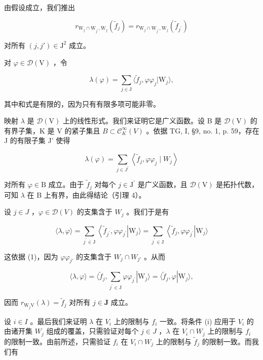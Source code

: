 由假设成立，我们推出

\[
r _ {\mathrm{W} _ {j} \cap \mathrm{W} _ {j ^ {\prime}}, \mathrm{W} _ {j}} (\widetilde {f} _ {j}) = r _ {\mathrm{W} _ {j} \cap \mathrm{W} _ {j ^ {\prime}}, \mathrm{W} _ {j}} (\widetilde {f} _ {j ^ {\prime}})\tag{1}
\]

对所有 \((j, j') \in \mathrm{J}^{2}\) 成立。

对 \(\varphi \in \mathcal{D}(\mathrm{V})\) ，令

\[
\lambda (\varphi) = \sum_ {j \in \mathrm{J}} \langle \widetilde {f} _ {j}, \varphi \varphi_ {j} | \mathrm{W} _ {j} \rangle ,
\]

其中和式是有限的，因为只有有限多项可能非零。

映射 \(\lambda\) 是 \(\mathcal{D}(\mathrm{V})\) 上的线性形式。我们来证明它是广义函数。设 B 是 \(\mathcal{D}(\mathrm{V})\) 的有界子集，K 是 V 的紧子集且 \(B \subset \mathcal{C}_{K}^{\infty}(V)\) 。依据 TG, I, §9, no. 1, p. 59，存在 J 的有限子集 J' 使得

\[
\lambda (\varphi) = \sum_ {j \in J ^ {\prime}} \left\langle \widetilde {f} _ {j}, \varphi \varphi_ {j} \mid W _ {j} \right\rangle
\]

对所有 \(\varphi\in\mathrm{B}\) 成立。由于 \(\widetilde{f}_{j}\) 对每个 \(j\in\mathrm{J}^{\prime}\) 是广义函数，且 \(\mathcal{D}(\mathrm{V})\) 是拓扑代数，可知 \(\lambda\) 在 B 上有界，由此得结论（引理 4）。

设 \(j \in J\) ，\(\varphi \in \mathcal{D}(V)\) 的支集含于 \(W_{j}\) 。我们于是有

\[
\langle \lambda , \varphi \rangle = \sum_ {j ^ {\prime} \in \mathrm{J}} \left\langle \widetilde {f} _ {j ^ {\prime}}, \varphi \varphi_ {j ^ {\prime}} \right| \mathrm{W} _ {j} \rangle = \sum_ {j ^ {\prime} \in \mathrm{J}} \left\langle \widetilde {f} _ {j}, \varphi \varphi_ {j ^ {\prime}} \right| \mathrm{W} _ {j} \rangle
\]

这依据 (1)，因为 \(\varphi\varphi_{j'}\) 的支集含于 \(W_j \cap W_{j'}\) 。从而

\[
\langle \lambda , \varphi \rangle = \langle \widetilde {f} _ {j}, \sum_ {j ^ {\prime} \in \mathrm{J}} \varphi \varphi_ {j ^ {\prime}} | \mathrm{W} _ {j} \rangle = \langle \widetilde {f} _ {j}, \varphi | \mathrm{W} _ {j} \rangle ,
\]

因而 \(r_{\mathrm{W}_j\mathrm{V}}(\lambda) = \widetilde{f}_j\) 对所有 \(j\in \mathbf{J}\) 成立。

设 \(i \in I\) 。最后我们来证明 \(\lambda\) 在 \(V_i\) 上的限制与 \(f_i\) 一致。将条件 (i) 应用于 \(V_i\) 的由诸开集 \(W_j\) 组成的覆盖，只需验证对每个 \(j \in J\) ，\(\lambda\) 在 \(V_i \cap W_j\) 上的限制与 \(f_i\) 的限制一致。由前所述，只需验证 \(f_i\) 在 \(V_i \cap W_j\) 上的限制与 \(\widetilde{f}_j\) 的限制一致。而我们有

